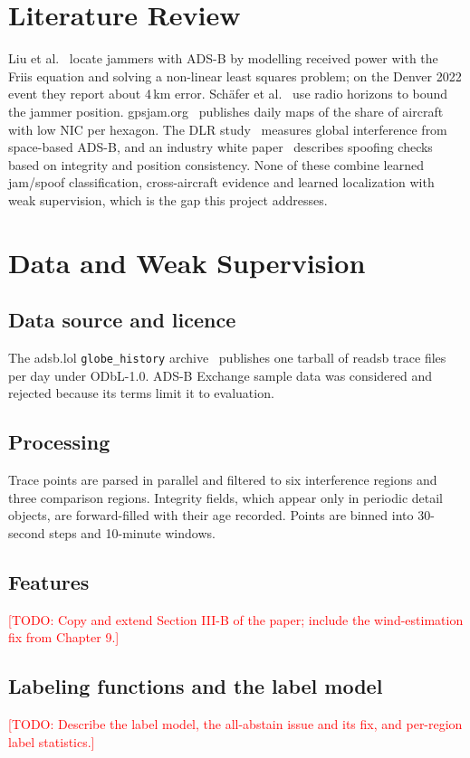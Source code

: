 \documentclass[12pt,a4paper,oneside]{report}
\newcommand{\todo}[1]{\textcolor{red}{[TODO: #1]}}
\begin{document}
\chapter{Literature Review}
Liu et al.~\cite{liu2022itm,liu2025nls} locate jammers with ADS-B by modelling received power with the Friis equation and
solving a non-linear least squares problem; on the Denver 2022 event they report about 4\,km error. Sch\"afer et
al.~\cite{jammerhorizon} use radio horizons to bound the jammer position. gpsjam.org~\cite{gpsjam} publishes daily maps of the
share of aircraft with low NIC per hexagon. The DLR study~\cite{eichstaedt2026sharc} measures global interference from
space-based ADS-B, and an industry white paper~\cite{aireon2026spoofing} describes spoofing checks based on integrity and
position consistency. None of these combine learned jam/spoof classification, cross-aircraft evidence and learned
localization with weak supervision, which is the gap this project addresses.

\chapter{Data and Weak Supervision}
\section{Data source and licence}
The adsb.lol \texttt{globe\_history} archive~\cite{adsblol} publishes one tarball of readsb trace files per day under ODbL-1.0.
ADS-B Exchange sample data was considered and rejected because its terms limit it to evaluation. \datasetsentence
\section{Processing}
Trace points are parsed in parallel and filtered to six interference regions and three comparison regions. Integrity fields,
which appear only in periodic detail objects, are forward-filled with their age recorded. Points are binned into 30-second steps
and 10-minute windows.
\section{Features}
\todo{Copy and extend Section III-B of the paper; include the wind-estimation fix from Chapter 9.}
\section{Labeling functions and the label model}

\todo{Describe the label model, the all-abstain issue and its fix, and per-region label statistics.}
\end{document}
